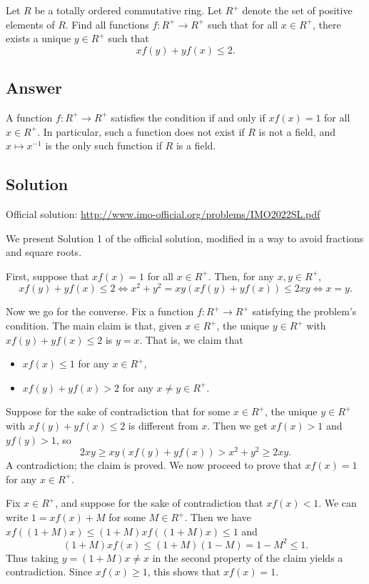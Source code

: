 Let $R$ be a totally ordered commutative ring.
Let $R^+$ denote the set of positive elements of $R$.
Find all functions $f : R^+ \to R^+$ such that for all $x \in R^+$, there exists a unique $y \in R^+$ such that
\[ x f(y) + y f(x) \leq 2. \]



\subsection*{Answer}

A function $f : R^+ \to R^+$ satisfies the condition if and only if $x f(x) = 1$ for all $x \in R^+$.
In particular, such a function does not exist if $R$ is not a field, and $x \mapsto x^{-1}$ is the only such function if $R$ is a field.



\subsection*{Solution}

Official solution: \url{http://www.imo-official.org/problems/IMO2022SL.pdf}

We present Solution 1 of the official solution, modified in a way to avoid fractions and square roots.

First, suppose that $x f(x) = 1$ for all $x \in R^+$.
Then, for any $x, y \in R^+$,
\[ x f(y) + y f(x) \leq 2 \iff x^2 + y^2 = xy(x f(y) + y f(x)) \leq 2xy \iff x = y. \]

Now we go for the converse.
Fix a function $f : R^+ \to R^+$ satisfying the problem's condition.
The main claim is that, given $x \in R^+$, the unique $y \in R^+$ with $x f(y) + y f(x) \leq 2$ is $y = x$.
That is, we claim that
\begin{itemize}
    \item   $x f(x) \leq 1$ for any $x \in R^+$,
    \item   $x f(y) + y f(x) > 2$ for any $x \neq y \in R^+$.
\end{itemize}

Suppose for the sake of contradiction that for some $x \in R^+$, the unique $y \in R^+$ with $x f(y) + y f(x) \leq 2$ is different from $x$.
Then we get $x f(x) > 1$ and $y f(y) > 1$, so
\[ 2xy \geq xy (x f(y) + y f(x)) > x^2 + y^2 \geq 2xy. \]
A contradiction; the claim is proved.
We now proceed to prove that $x f(x) = 1$ for any $x \in R^+$.

Fix $x \in R^+$, and suppose for the sake of contradiction that $x f(x) < 1$.
We can write $1 = x f(x) + M$ for some $M \in R^+$.
Then we have $x f((1 + M) x) \leq (1 + M) x f((1 + M) x) \leq 1$ and
\[ (1 + M) x f(x) \leq (1 + M)(1 - M) = 1 - M^2 \leq 1. \]
Thus taking $y = (1 + M) x \neq x$ in the second property of the claim yields a contradiction.
Since $x f(x) \geq 1$, this shows that $x f(x) = 1$.
